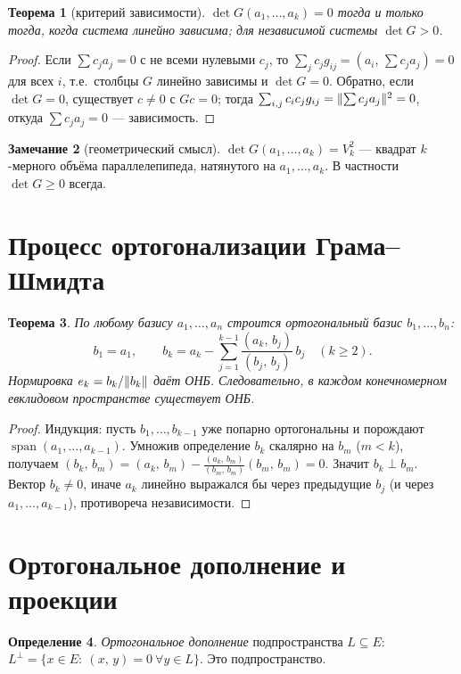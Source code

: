 \documentclass[11pt,a4paper]{article}
\theoremstyle{definition}
\newtheorem{definition}{Определение}[section]
\newtheorem{remark}[definition]{Замечание}
\theoremstyle{plain}
\newtheorem{theorem}[definition]{Теорема}
\DeclareMathOperator{\Span}{span}
\renewcommand{\ge}{\geqslant}
\newcommand{\scal}[2]{\left( #1,\,#2\right)}
\DeclarePairedDelimiter{\norm}{\lVert}{\rVert}
\begin{document}
\begin{theorem}[критерий зависимости]
$\det G(a_1,\dots,a_k)=0$ тогда и только тогда, когда система линейно зависима; для независимой
системы $\det G>0$.
\end{theorem}

\begin{proof}
Если $\sum c_j a_j=0$ с не всеми нулевыми $c_j$, то $\sum_j c_j g_{ij}=\scal{a_i}{\sum c_j a_j}=0$
для всех $i$, т.е.\ столбцы $G$ линейно зависимы и $\det G=0$. Обратно, если $\det G=0$, существует
$c\ne0$ с $Gc=0$; тогда $\sum_{i,j}c_i c_j g_{ij}=\norm{\sum c_j a_j}^2=0$, откуда $\sum c_j a_j=0$
— зависимость.
\end{proof}

\begin{remark}[геометрический смысл]
$\det G(a_1,\dots,a_k)=V_k^2$ — квадрат $k$-мерного объёма параллелепипеда, натянутого на
$a_1,\dots,a_k$. В частности $\det G\ge0$ всегда.
\end{remark}

\section{Процесс ортогонализации Грама–Шмидта}

\begin{theorem}
По любому базису $a_1,\dots,a_n$ строится ортогональный базис $b_1,\dots,b_n$:
\[
  b_1=a_1,\qquad b_k=a_k-\sum_{j=1}^{k-1}\frac{\scal{a_k}{b_j}}{\scal{b_j}{b_j}}\,b_j\quad(k\ge2).
\]
Нормировка $e_k=b_k/\norm{b_k}$ даёт ОНБ. Следовательно, в каждом конечномерном евклидовом
пространстве существует ОНБ.
\end{theorem}

\begin{proof}
Индукция: пусть $b_1,\dots,b_{k-1}$ уже попарно ортогональны и порождают $\Span(a_1,\dots,a_{k-1})$.
Умножив определение $b_k$ скалярно на $b_m$ ($m<k$), получаем
$\scal{b_k}{b_m}=\scal{a_k}{b_m}-\frac{\scal{a_k}{b_m}}{\scal{b_m}{b_m}}\scal{b_m}{b_m}=0$. Значит
$b_k\perp b_m$. Вектор $b_k\ne0$, иначе $a_k$ линейно выражался бы через предыдущие $b_j$ (и через
$a_1,\dots,a_{k-1}$), противореча независимости.
\end{proof}

\section{Ортогональное дополнение и проекции}

\begin{definition}
\emph{Ортогональное дополнение} подпространства $L\subseteq E$:
$L^\perp=\{x\in E:\ \scal xy=0\ \forall y\in L\}$. Это подпространство.
\end{definition}
\end{document}
